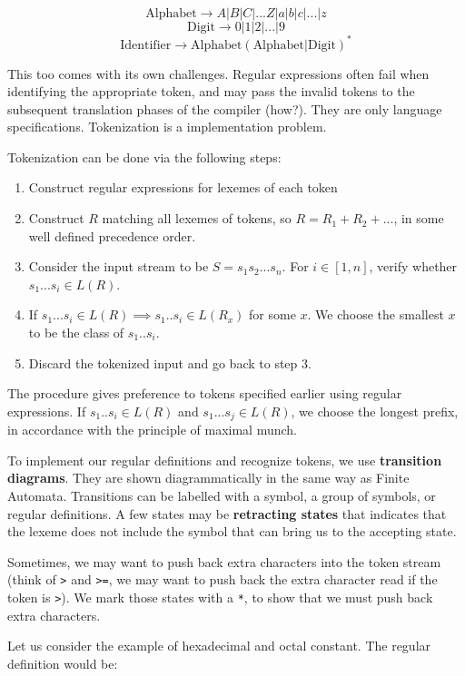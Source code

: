 \documentclass[12pt,letterpaper]{book}
\theoremstyle{definition}
\begin{document}
\[\text{Alphabet} \rightarrow A|B|C|...Z|a|b|c|...|z\]
\[\text{Digit} \rightarrow 0|1|2|...|9\]
\[\text{Identifier} \rightarrow \text{Alphabet}(\text{Alphabet} | \text{Digit})^*\]

This too comes with its own challenges. Regular expressions often fail when identifying the appropriate token, and may pass the invalid tokens to the subsequent translation phases of the compiler (how?). They are only language specifications. Tokenization is a implementation problem.

Tokenization can be done via the following steps:

\begin{enumerate}
  \item Construct regular expressions for lexemes of each token
  \item Construct $R$ matching all lexemes of tokens, so $R = R_1+R_2+...$, in some well defined precedence order.
  \item Consider the input stream to be $S=s_1s_2...s_n$. For $i \in [1,n]$, verify whether $s_1...s_i \in L(R)$.
  \item If $s_1...s_i \in L(R) \implies s_1..s_i \in L(R_x)$ for some $x$. We choose the smallest $x$ to be the class of $s_1..s_i$. 
  \item Discard the tokenized input and go back to step 3.
\end{enumerate}

The procedure gives preference to tokens specified earlier using regular expressions. If $s_1..s_i \in L(R)$ and $s_1...s_j \in L(R)$, we choose the longest prefix, in accordance with the principle of maximal munch.

To implement our regular definitions and recognize tokens, we use \textbf{transition diagrams}. They are shown diagrammatically in the same way as Finite Automata. Transitions can be labelled with a symbol, a group of symbols, or regular definitions. A few states may be \textbf{retracting states} that indicates that the lexeme does not include the symbol that can bring us to the accepting state.

Sometimes, we may want to push back extra characters into the token stream (think of \texttt{>} and \texttt{>=}, we may want to push back the extra character read if the token is \texttt{>}). We mark those states with a \texttt{*}, to show that we must push back extra characters.

Let us consider the example of hexadecimal and octal constant. The regular definition would be:
\end{document}
